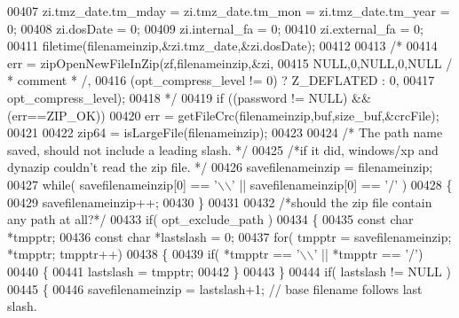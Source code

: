\begin{DoxyCode}
{{{{{{{00407                 zi.tmz\_date.tm\_mday = zi.tmz\_date.tm\_mon = zi.tmz\_date.tm\_year = 0;
00408                 zi.dosDate = 0;
00409                 zi.internal\_fa = 0;
00410                 zi.external\_fa = 0;
00411                 filetime(filenameinzip,&zi.tmz\_date,&zi.dosDate);
00412 
00413 \textcolor{comment}{/*}
00414 \textcolor{comment}{                err = zipOpenNewFileInZip(zf,filenameinzip,&zi,}
00415 \textcolor{comment}{                                 NULL,0,NULL,0,NULL / * comment * /,}
00416 \textcolor{comment}{                                 (opt\_compress\_level != 0) ? Z\_DEFLATED : 0,}
00417 \textcolor{comment}{                                 opt\_compress\_level);}
00418 \textcolor{comment}{*/}
00419                 \textcolor{keywordflow}{if} ((password != NULL) && (err==ZIP\_OK))
00420                     err = getFileCrc(filenameinzip,buf,size\_buf,&crcFile);
00421 
00422                 zip64 = isLargeFile(filenameinzip);
00423 
00424                                                          \textcolor{comment}{/* The path name saved, should not include a
       leading slash. */}
00425                \textcolor{comment}{/*if it did, windows/xp and dynazip couldn't read the zip file. */}
00426                  savefilenameinzip = filenameinzip;
00427                  \textcolor{keywordflow}{while}( savefilenameinzip[0] == \textcolor{charliteral}{'\(\backslash\)\(\backslash\)'} || savefilenameinzip[0] == \textcolor{charliteral}{'/'} )
00428                  \{
00429                      savefilenameinzip++;
00430                  \}
00431 
00432                  \textcolor{comment}{/*should the zip file contain any path at all?*/}
00433                  \textcolor{keywordflow}{if}( opt\_exclude\_path )
00434                  \{
00435                      \textcolor{keyword}{const} \textcolor{keywordtype}{char} *tmpptr;
00436                      \textcolor{keyword}{const} \textcolor{keywordtype}{char} *lastslash = 0;
00437                      \textcolor{keywordflow}{for}( tmpptr = savefilenameinzip; *tmpptr; tmpptr++)
00438                      \{
00439                          \textcolor{keywordflow}{if}( *tmpptr == \textcolor{charliteral}{'\(\backslash\)\(\backslash\)'} || *tmpptr == \textcolor{charliteral}{'/'})
00440                          \{
00441                              lastslash = tmpptr;
00442                          \}
00443                      \}
00444                      \textcolor{keywordflow}{if}( lastslash != NULL )
00445                      \{
00446                          savefilenameinzip = lastslash+1; \textcolor{comment}{// base filename follows last slash.}
}}}}}}}
\end{DoxyCode}
